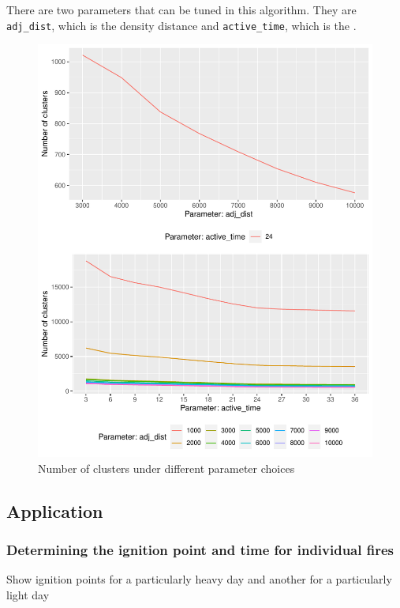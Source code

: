 There are two parameters that can be tuned in this algorithm. They are
\texttt{adj\_dist}, which is the density distance and
\texttt{active\_time}, which is the .

\begin{Schunk}
\begin{figure}
\includegraphics[width=0.8\linewidth]{clustering_paper_files/figure-latex/para_1-1} \caption[Number of clusters under different parameter choices]{Number of clusters under different parameter choices}\label{fig:para_1}
\end{figure}
\end{Schunk}

\hypertarget{application}{%
\subsection{Application}\label{application}}

\hypertarget{determining-the-ignition-point-and-time-for-individual-fires}{%
\subsubsection{Determining the ignition point and time for individual
fires}\label{determining-the-ignition-point-and-time-for-individual-fires}}

Show ignition points for a particularly heavy day and another for a
particularly light day

